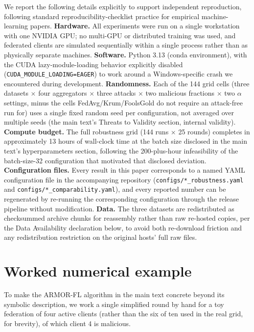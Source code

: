 \documentclass[a4paper,11pt]{article}
\begin{document}
We report the following details explicitly to support independent reproduction, following standard reproducibility-checklist practice for empirical machine-learning papers. \textbf{Hardware.} All experiments were run on a single workstation with one NVIDIA GPU; no multi-GPU or distributed training was used, and federated clients are simulated sequentially within a single process rather than as physically separate machines. \textbf{Software.} Python 3.13 (conda environment), with the CUDA lazy-module-loading behavior explicitly disabled (\texttt{CUDA\_MODULE\_LOADING=EAGER}) to work around a Windows-specific crash we encountered during development. \textbf{Randomness.} Each of the 144 grid cells (three datasets $\times$ four aggregators $\times$ three attacks $\times$ two malicious fractions $\times$ two $\alpha$ settings, minus the cells FedAvg/Krum/FoolsGold do not require an attack-free run for) uses a single fixed random seed per configuration, not averaged over multiple seeds (the main text's Threats to Validity section, internal validity). \textbf{Compute budget.} The full robustness grid (144 runs $\times$ 25 rounds) completes in approximately 13 hours of wall-clock time at the batch size disclosed in the main text's hyperparameters section, following the 200-plus-hour infeasibility of the batch-size-32 configuration that motivated that disclosed deviation. \textbf{Configuration files.} Every result in this paper corresponds to a named YAML configuration file in the accompanying repository (\texttt{configs/*\_robustness.yaml} and \texttt{configs/*\_comparability.yaml}), and every reported number can be regenerated by re-running the corresponding configuration through the release pipeline without modification. \textbf{Data.} The three datasets are redistributed as checksummed archive chunks for reassembly rather than raw re-hosted copies, per the Data Availability declaration below, to avoid both re-download friction and any redistribution restriction on the original hosts' full raw files.

\section{Worked numerical example}\label{app:worked}

To make the ARMOR-FL algorithm in the main text concrete beyond its symbolic description, we work a single simplified round by hand for a toy federation of four active clients (rather than the six of ten used in the real grid, for brevity), of which client 4 is malicious.
\end{document}
